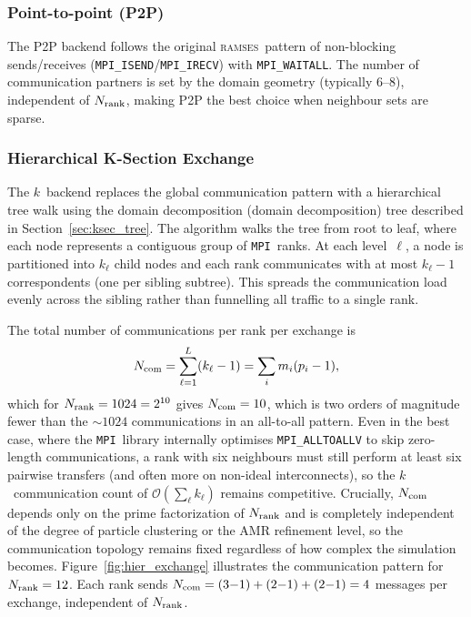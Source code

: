 \documentclass[fleqn,usenatbib]{mnras}
\newcommand{\ramses}{\textsc{ramses}}
\newcommand{\nrank}{N_{\rm rank}}
\newcommand{\ksec}{\ensuremath{k}\text{-section}}
\newcommand{\Olog}[1]{\mathcal{O}(#1)}
\newcommand{\code}[1]{\texttt{#1}}
\newcommand{\mpi}[0]{\texttt{MPI}}
\newcommand{\dd}[0]{{domain decomposition}}
\begin{document}
\subsubsection{Point-to-point (P2P)}
\label{sec:backend_p2p}

The P2P backend follows the original \ramses\ pattern of non-blocking
sends/receives (\code{MPI\_ISEND}/\code{MPI\_IRECV}) with
\code{MPI\_WAITALL}.  The number of communication partners is set by
the domain geometry (typically 6--8), independent of $\nrank$, making
P2P the best choice when neighbour sets are sparse.

\subsubsection{Hierarchical K-Section Exchange}
\label{sec:backend_ksection}

The \ksec\ backend replaces the global communication pattern with a
hierarchical tree walk using the domain decomposition (\dd) tree described
in Section~\ref{sec:ksec_tree}.  The algorithm walks the tree from
root to leaf, where each node represents a contiguous group of \mpi\
ranks.  At each level~$\ell$, a node is
partitioned into $k_\ell$ child nodes and each rank communicates with at
most $k_\ell - 1$ correspondents (one per sibling subtree).  This spreads the communication load evenly across the
sibling rather than funnelling all traffic to a single rank.

The total number of communications per rank per exchange is
\begin{equation}
N_{\rm com} = \sum_{\ell=1}^{L} (k_\ell - 1) = \sum_i m_i (p_i - 1),
\label{eq:msg_count}
\end{equation}
which for $\nrank = 1024 = 2^{10}$ gives $N_{\rm com} = 10$, which is two
orders of magnitude fewer than the ${\sim}1024$ communications in an
all-to-all pattern. Even in the best case, where the \mpi\ library
internally optimises \code{MPI\_ALLTOALLV} to skip zero-length
communications, a rank with six neighbours must still perform at least six
pairwise transfers (and often more on non-ideal interconnects), so the
\ksec\ communication count of $\Olog{\sum_\ell k_\ell}$ remains competitive.
Crucially, $N_{\rm com}$ depends only on the prime factorization of
$\nrank$ and is completely independent of the degree of particle
clustering or the AMR refinement level, so the communication topology remains fixed regardless of how complex the simulation becomes. Figure~\ref{fig:hier_exchange} illustrates the communication pattern
for $\nrank = 12$.  Each rank sends $N_{\rm com} = (3{-}1) + (2{-}1) +
(2{-}1) = 4$ messages per exchange, independent of $\nrank$.
\end{document}
